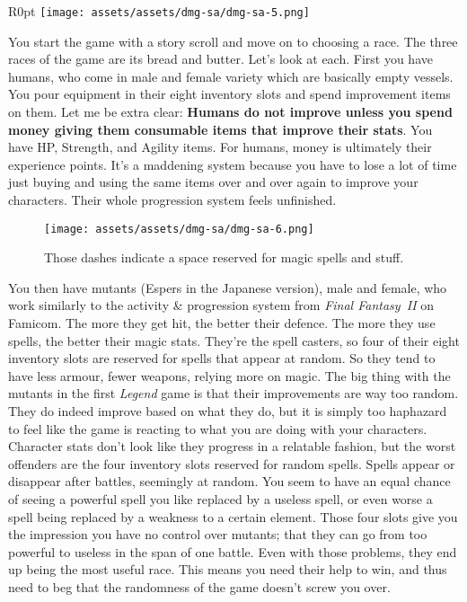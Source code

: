 \documentclass{book}
\begin{document}
\begin{wrapfigure}{R}{0pt} \texttt{[image: assets/assets/dmg-sa/dmg-sa-5.png]}\end{wrapfigure}
You start the game with a story scroll and move on to choosing a race. The three races of the game are its bread and butter. Let’s look at each. First you have humans, who come in male and female variety which are basically empty vessels. You pour equipment in their eight inventory slots and spend improvement items on them. Let me be extra clear: \textbf{Humans do not improve unless you spend money giving them consumable items that improve their stats}. You have HP, Strength, and Agility items. For humans, money is ultimately their experience points. It’s a maddening system because you have to lose a lot of time just buying and using the same items over and over again to improve your characters. Their whole progression system feels unfinished.

\begin{figure}[hbt]
\vskip 10pt
\centering \texttt{[image: assets/assets/dmg-sa/dmg-sa-6.png]}\par\pagetwodescription Those dashes indicate a space reserved for magic spells and stuff.
\vskip 6pt
\end{figure}

You then have mutants (Espers in the Japanese version), male and female, who work similarly to the activity \& progression system from \emph{Final Fantasy II} on Famicom. The more they get hit, the better their defence. The more they use spells, the better their magic stats. They’re the spell casters, so four of their eight inventory slots are reserved for spells that appear at random. So they tend to have less armour, fewer weapons, relying more on magic. The big thing with the mutants in the first \emph{Legend} game is that their improvements are way too random. They do indeed improve based on what they do, but it is simply too haphazard to feel like the game is reacting to what you are doing with your characters. Character stats don’t look like they progress in a relatable fashion, but the worst offenders are the four inventory slots reserved for random spells. Spells appear or disappear after battles, seemingly at random. You seem to have an equal chance of seeing a powerful spell you like replaced by a useless spell, or even worse a spell being replaced by a weakness to a certain element. Those four slots give you the impression you have no control over mutants; that they can go from too powerful to useless in the span of one battle. Even with those problems, they end up being the most useful race. This means you need their help to win, and thus need to beg that the randomness of the game doesn’t screw you over.
\end{document}
